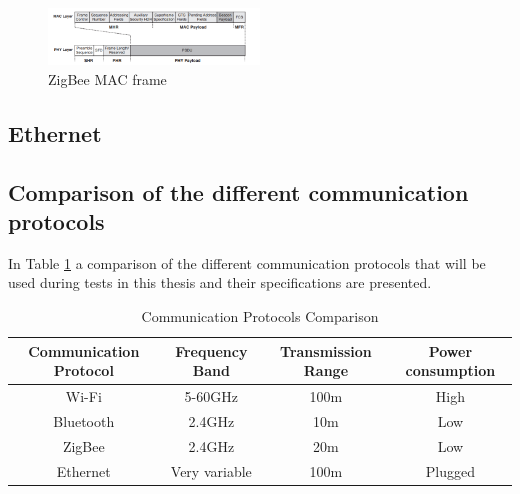 \begin{figure}[h]
    \centering
    \includegraphics[width=0.5\textwidth]{figures/Zigbee.png}
    \caption{ZigBee MAC frame}
    \label{ZigbeePic}
\end{figure}

\subsection{Ethernet}

\subsection{Comparison of the different communication protocols}
In Table \ref{CommunicationProtocolsComparison} a comparison of the different communication protocols that will be used during tests in this thesis and their specifications are presented. \\
\begin{table}[!hbtp]
\begin{tabular}{||c | c | c | c ||} 
 \hline
 Communication Protocol & Frequency Band & Transmission Range & Power consumption\\ [0.5ex]
 \hline\hline
 Wi-Fi & 5-60GHz & 100m & High\\ 
 Bluetooth & 2.4GHz & 10m & Low\\
 ZigBee & 2.4GHz & 20m & Low \\
 Ethernet & Very variable & 100m & Plugged\\ [1ex] 
 \hline
\end{tabular}
\caption{Communication Protocols Comparison}
\label{CommunicationProtocolsComparison}
\end{table}